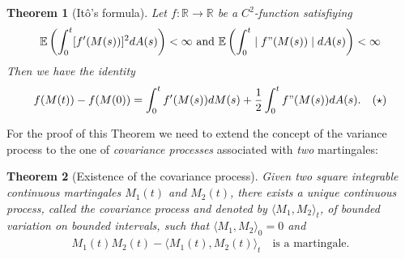 \documentclass[11pt,a4paper, final]{article}
\newtheorem{thm}{Theorem}[section]
\begin{document}
\begin{thm}[Itô's formula] \label{itosformula}
Let $f: \mathbb{R} \to \mathbb{R}$ be a $C^2$-function satisfiying
\begin{align*}
\mathbb{E}\left( \int_0^t [f'(M(s))]^2 dA(s) \right) < \infty \text{ and } 
\mathbb{E}\left( \int_0^t \mid f"(M(s))\mid dA(s) \right) < \infty
\end{align*}
Then we have the identity
\begin{align*}
f(M(t))-f(M(0))= \int_0^t f'(M(s)) dM(s) + \frac{1}{2} \int_0^t f"(M(s)) dA(s). \quad (\star)
\end{align*}
\end{thm}
\noindent For the proof of this Theorem we need to extend the concept of the variance process to the one of \textit{covariance processes} associated with \textit{two} martingales:
\begin{thm}[Existence of the covariance process]
Given two square integrable continuous martingales $M_1(t)$ and $M_2(t)$, there exists a unique continuous process, called the covariance process and denoted by
$\langle M_1,M_2\rangle_t$, of bounded variation on bounded intervals, such that $\langle M_1,M_2\rangle_0=0$ and 
\begin{align*}M_1(t) M_2(t)-\langle M_1(t),M_2(t) \rangle_t \quad \text{is a martingale.}
\end{align*}
\end{thm}
\end{document}
